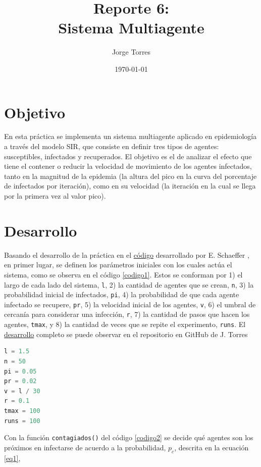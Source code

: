 \documentclass{article}
\title{Reporte 6:\\Sistema Multiagente}
\author{Jorge Torres}
\date{\today}
\begin{document}
\maketitle

\section{Objetivo}
En esta pr\'actica se implementa un sistema multiagente aplicado en epidemiolog\'ia a trav\'es del modelo SIR, que consiste en definir tres tipos de agentes: susceptibles, infectados y recuperados. El objetivo es el de analizar el efecto que tiene el contener o reducir la velocidad de movimiento de los agentes infectados, tanto en la magnitud de la epidemia (la altura del pico en la curva del porcentaje de infectados por iteración), como en su velocidad (la iteración en la cual se llega por la primera vez al valor pico).

\section{Desarrollo}
Basando el desarrollo de la pr\'actica en el \href{https://github.com/satuelisa/Simulation/blob/master/MultiAgent/SIR.py}{c\'odigo} desarrollado por E. Schaeffer \cite{elisa1}, en primer lugar, se definen los par\'ametros iniciales con los cuales act\'ua el sistema, como se observa en el c\'odigo \ref{codigo1}. Estos se conforman por 1) el largo de cada lado del sistema, \texttt{l}, 2) la cantidad de agentes que se crean, \texttt{n}, 3) la probabilidad inicial de infectados, \texttt{pi}, 4) la probabilidad de que cada agente infectado se recupere, \texttt{pr}, 5) la velocidad inicial de los agentes, \texttt{v}, 6) el umbral de cercan\'ia para considerar una infecci\'on, \texttt{r}, 7) la cantidad de pasos que hacen los agentes, \texttt{tmax}, y 8) la cantidad de veces que se repite el experimento, \texttt{runs}. El \href{https://github.com/FeroxDeitas/Simulacion-Nano/blob/main/Tareas/P6/epidemia_r.py}{desarrollo} completo se puede observar en el repositorio en GitHub de J. Torres \cite{jorge1}

\begin{lstlisting}[caption=Par\'ametros Iniciales, label=codigo1, language=Python]
l = 1.5
n = 50
pi = 0.05
pr = 0.02
v = l / 30
r = 0.1
tmax = 100
runs = 100
\end{lstlisting}

Con la funci\'on \texttt{contagiados()} del c\'odigo \ref{codigo2} se decide qu\'e agentes son los pr\'oximos en infectarse de acuerdo a la probabilidad, $p_c$, descrita en la ecuaci\'on \ref{eq1},
\end{document}
